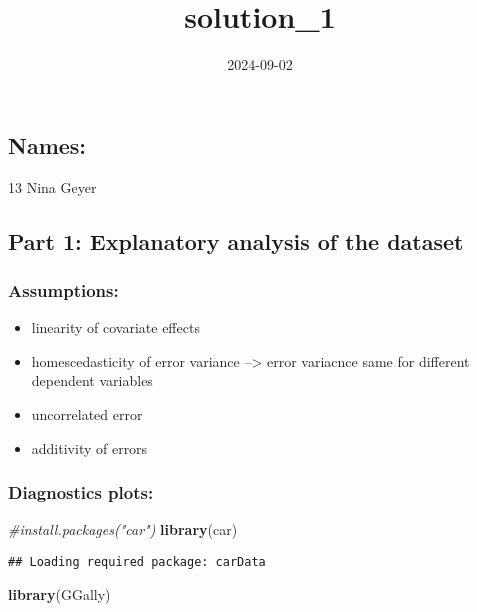 \documentclass[
]{article}
\title{solution\_1}
\author{}
\date{\vspace{-2.5em}2024-09-02}
\newenvironment{Shaded}{\begin{snugshade}}{\end{snugshade}}
\newcommand{\CommentTok}[1]{\textcolor[rgb]{0.56,0.35,0.01}{\textit{#1}}}
\newcommand{\FunctionTok}[1]{\textcolor[rgb]{0.13,0.29,0.53}{\textbf{#1}}}
\newcommand{\NormalTok}[1]{#1}
\providecommand{\tightlist}{%
  \setlength{\itemsep}{0pt}\setlength{\parskip}{0pt}}
\begin{document}
\maketitle

\hypertarget{names}{%
\subsection{Names:}\label{names}}

13 Nina Geyer

\hypertarget{part-1-explanatory-analysis-of-the-dataset}{%
\subsection{Part 1: Explanatory analysis of the
dataset}\label{part-1-explanatory-analysis-of-the-dataset}}

\hypertarget{assumptions}{%
\subsubsection{Assumptions:}\label{assumptions}}

\begin{itemize}
\tightlist
\item
  linearity of covariate effects
\item
  homescedasticity of error variance --\textgreater{} error variacnce
  same for different dependent variables
\item
  uncorrelated error
\item
  additivity of errors
\end{itemize}

\hypertarget{diagnostics-plots}{%
\subsubsection{Diagnostics plots:}\label{diagnostics-plots}}

\begin{Shaded}
\begin{Highlighting}[]
\CommentTok{\#install.packages("car")}
\FunctionTok{library}\NormalTok{(car)}
\end{Highlighting}
\end{Shaded}

\begin{verbatim}
## Loading required package: carData
\end{verbatim}

\begin{Shaded}
\begin{Highlighting}[]
\FunctionTok{library}\NormalTok{(GGally)}
\end{Highlighting}
\end{Shaded}
\end{document}
